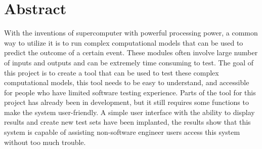 \chapter*{\Large \center Abstract}

With the inventions of supercomputer with powerful processing power, a common way to
utilize it is to run complex computational models that can be used to predict the outcome
of a certain event. These modules often involve large number of inputs and outputs and can
be extremely time consuming to test. The goal of this project is to create a tool that can be
used to test these complex computational models, this tool needs to be easy to understand,
and accessible for people who have limited software testing experience. Parts of the tool for
this project has already been in development, but it still requires some functions to make the
system user-friendly. A simple user interface with the ability to display results and create new
test sets have been implanted, the results show that this system is capable of assisting non-software engineer users access this system without too much trouble.

